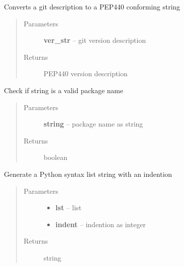\documentclass[letterpaper,10pt,english]{sphinxmanual}
\begin{document}

\begin{fulllineitems}
\label{_rst/pyscaffold:pyscaffold.utils.git2pep440}
Converts a git description to a PEP440 conforming string
\begin{quote}\begin{description}
\item[{Parameters}] \leavevmode
\textbf{ver\_str} -- git version description

\item[{Returns}] \leavevmode
PEP440 version description

\end{description}\end{quote}

\end{fulllineitems}


\begin{fulllineitems}
\label{_rst/pyscaffold:pyscaffold.utils.is_valid_identifier}
Check if string is a valid package name
\begin{quote}\begin{description}
\item[{Parameters}] \leavevmode
\textbf{string} -- package name as string

\item[{Returns}] \leavevmode
boolean

\end{description}\end{quote}

\end{fulllineitems}


\begin{fulllineitems}
\label{_rst/pyscaffold:pyscaffold.utils.list2str}
Generate a Python syntax list string with an indention
\begin{quote}\begin{description}
\item[{Parameters}] \leavevmode\begin{itemize}
\item {} 
\textbf{lst} -- list

\item {} 
\textbf{indent} -- indention as integer

\end{itemize}

\item[{Returns}] \leavevmode
string

\end{description}\end{quote}

\end{fulllineitems}
\end{document}
